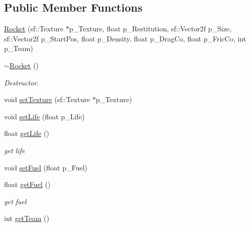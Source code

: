 \subsection*{Public Member Functions}
\begin{DoxyCompactItemize}
\item 
\hyperlink{class_rocket_a5ddbd398e8bfa09b242d77d866651702}{Rocket} (sf\+::\+Texture $\ast$p\+\_\+\+Texture, float p\+\_\+\+Restitution, sf\+::\+Vector2f p\+\_\+\+Size, sf\+::\+Vector2f p\+\_\+\+Start\+Pos, float p\+\_\+\+Density, float p\+\_\+\+Drag\+Co, float p\+\_\+\+Fric\+Co, int p\+\_\+\+Team)
\item 
\mbox{\label{class_rocket_ab0cbe044146250c3e592832bb4909ff9}} 
\hyperlink{class_rocket_ab0cbe044146250c3e592832bb4909ff9}{$\sim$\+Rocket} ()
\begin{DoxyCompactList}\small\item\em Destructor. \end{DoxyCompactList}\item 
void \hyperlink{class_rocket_a3ecac400b4edb82d8288be25f9a0b949}{set\+Texture} (sf\+::\+Texture $\ast$p\+\_\+\+Texture)
\item 
void \hyperlink{class_rocket_a775dd0b77b6f82010d9ff201d266bf89}{set\+Life} (float p\+\_\+\+Life)
\item 
\mbox{\label{class_rocket_ab6320ec0717a04f1709d91fb92d7cf74}} 
float \hyperlink{class_rocket_ab6320ec0717a04f1709d91fb92d7cf74}{get\+Life} ()
\begin{DoxyCompactList}\small\item\em get life \end{DoxyCompactList}\item 
void \hyperlink{class_rocket_aac617e928cc99125cf014ac5dbb57b9b}{set\+Fuel} (float p\+\_\+\+Fuel)
\item 
\mbox{\label{class_rocket_ad5e168da70869f966ddd535b38c18c8f}} 
float \hyperlink{class_rocket_ad5e168da70869f966ddd535b38c18c8f}{get\+Fuel} ()
\begin{DoxyCompactList}\small\item\em get fuel \end{DoxyCompactList}\item 
\mbox{\label{class_rocket_a43995d3f49c3d00f8d6c5bbe7aefc5e2}} 
int \hyperlink{class_rocket_a43995d3f49c3d00f8d6c5bbe7aefc5e2}{get\+Team} ()

\end{DoxyCompactItemize}
